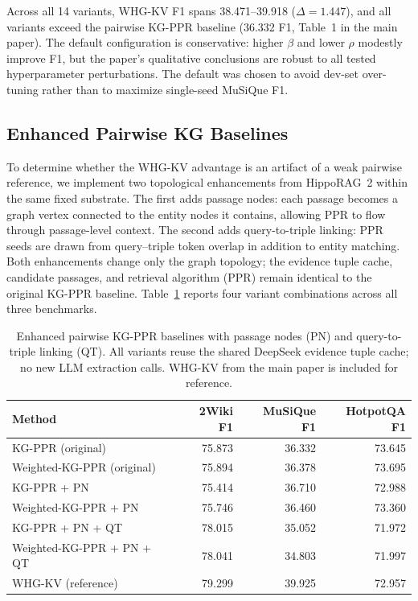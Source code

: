 \documentclass[conference]{IEEEtran}
\begin{document}
Across all 14 variants, WHG-KV F1 spans 38.471--39.918 ($\Delta{=}1.447$), and all variants exceed the pairwise KG-PPR baseline (36.332 F1, Table~1 in the main paper). The default configuration is conservative: higher $\beta$ and lower $\rho$ modestly improve F1, but the paper's qualitative conclusions are robust to all tested hyperparameter perturbations. The default was chosen to avoid dev-set over-tuning rather than to maximize single-seed MuSiQue F1.

\subsection{Enhanced Pairwise KG Baselines}

To determine whether the WHG-KV advantage is an artifact of a weak pairwise reference, we implement two topological enhancements from HippoRAG~2 \cite{hipporag2} within the same fixed substrate. The first adds passage nodes: each passage becomes a graph vertex connected to the entity nodes it contains, allowing PPR to flow through passage-level context. The second adds query-to-triple linking: PPR seeds are drawn from query--triple token overlap in addition to entity matching. Both enhancements change only the graph topology; the evidence tuple cache, candidate passages, and retrieval algorithm (PPR) remain identical to the original KG-PPR baseline. Table~\ref{tab:supp_enhanced_kg} reports four variant combinations across all three benchmarks.

\begin{table}[t]
\caption{Enhanced pairwise KG-PPR baselines with passage nodes (PN) and query-to-triple linking (QT). All variants reuse the shared DeepSeek evidence tuple cache; no new LLM extraction calls. WHG-KV from the main paper is included for reference.}
\label{tab:supp_enhanced_kg}
\centering
\scriptsize
\begin{tabular}{lrrr}
\toprule
Method & 2Wiki F1 & MuSiQue F1 & HotpotQA F1 \\
\midrule
KG-PPR (original) & 75.873 & 36.332 & 73.645 \\
Weighted-KG-PPR (original) & 75.894 & 36.378 & 73.695 \\
\midrule
KG-PPR + PN & 75.414 & 36.710 & 72.988 \\
Weighted-KG-PPR + PN & 75.746 & 36.460 & 73.360 \\
KG-PPR + PN + QT & 78.015 & 35.052 & 71.972 \\
Weighted-KG-PPR + PN + QT & 78.041 & 34.803 & 71.997 \\
\midrule
WHG-KV (reference) & 79.299 & 39.925 & 72.957 \\
\bottomrule
\end{tabular}
\end{table}
\end{document}
